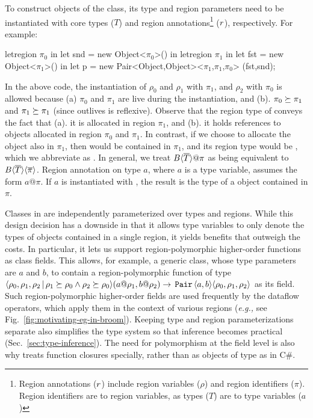 To construct objects of the  class, its type and region
parameters need to be instantiated with core types ($T$) and region
annotations\footnote{Region annotations ($r$) include region
variables ($\rho$) and region identifiers ($\pi$). Region identifiers
are to region variables, as types ($T$) are to type variables ($a$)}
($r$), respectively. For example:
\begin{codejava}

letregion $\pi_0$ in
  let snd = new Object<$\pi_0$>() in
  letregion $\pi_1$ in
    let fst = new Object<$\pi_1$>() in
    let p = new Pair<Object,Object><$\pi_1$,$\pi_1$,$\pi_0$> (fst,snd);
\end{codejava}
In the above code, the instantiation of $\rho_0$ and $\rho_1$ with
$\pi_1$, and $\rho_2$ with $\pi_0$ is allowed because (a) $\pi_0$ and
$\pi_1$ are live during the instantiation, and (b). $\pi_0 \succeq
\pi_1$ and $\pi_1 \succeq \pi_1$ (since outlives is reflexive).
Observe that the region type of  conveys the fact that (a). it is
allocated in region $\pi_1$, and (b). it holds references to objects
allocated in region $\pi_0$ and $\pi_1$.  In contrast, if we choose to
allocate the  object also in $\pi_1$, then  would be
contained in $\pi_1$, and its region type would be
, which we abbreviate as
. In general, we treat
$B\inang{\tbar}@\pi$ as being equivalent to
$B\langle \overline{T} \rangle\langle \overline{\pi} \rangle$. Region annotation on type $a$,
where $a$ is a type variable, assumes the form $a@\pi$. If $a$ is
instantiated with , the result is the type of a
 object contained in  $\pi$.  

Classes in \FB are independently parameterized over types and regions.
While this design decision has a downside in that it allows type
variables to only denote the types of objects contained in a single
region, it yields benefits that outweigh the costs. In particular, it
lets us support region-polymorphic higher-order functions as class
fields.  This allows, for example, a generic class, whose type
parameters are $a$ and $b$, to contain a region-polymorphic function
of type $\langle \rho_0,\rho_1,\rho_2 \,|\, \rho_1 \succeq \rho_0
\wedge \rho_2 \succeq \rho_0 \rangle(a@\rho_1,b@\rho_2) \rightarrow
\,{\tt Pair}\,\langle a,b \rangle\langle \rho_0,\rho_1,\rho_2 \rangle$ as its field. Such
region-polymorphic higher-order fields are used frequently by the
dataflow operators, which apply them in the context of various regions
(\emph{e.g.,} see Fig.~\ref{fig:motivating-eg-in-broom}). Keeping type
and region parameterizations separate also simplifies the type system
so that inference becomes practical (Sec.~\ref{sec:type-inference}).
The need for polymorphism at the field level is also why \FB treats
function closures specially, rather than as objects of type 
as in C\#.

